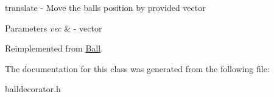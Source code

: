 translate -\/ Move the ball\textquotesingle{}s position by provided vector 


\begin{DoxyParams}{Parameters}
{\em vec} & -\/ vector \\
\hline
\end{DoxyParams}


Reimplemented from \mbox{\hyperlink{class_ball_a88546ffd1a37b301a5c7085f3eabe8f0}{Ball}}.



The documentation for this class was generated from the following file\+:\begin{DoxyCompactItemize}
\item 
balldecorator.\+h\end{DoxyCompactItemize}
